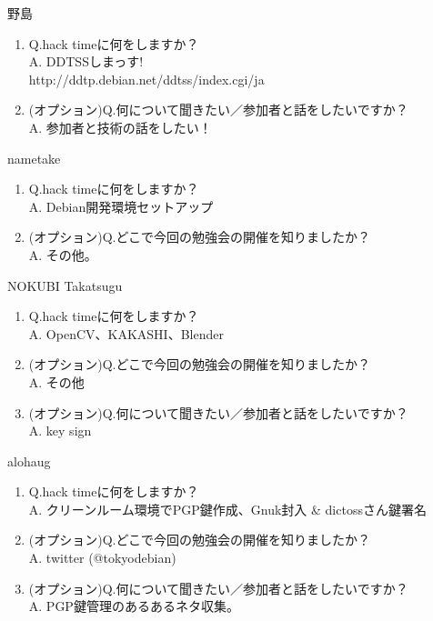 \begin{prework}{ 野島 }
  \begin{enumerate}
  \item Q.hack timeに何をしますか？\\
    A. DDTSSしまっす!\\
    http://ddtp.debian.net/ddtss/index.cgi/ja
  \item (オプション)Q.何について聞きたい／参加者と話をしたいですか？\\
    A. 参加者と技術の話をしたい！
  \end{enumerate}
\end{prework}

\begin{prework}{ nametake }
  \begin{enumerate}
  \item Q.hack timeに何をしますか？\\
    A. Debian開発環境セットアップ
  \item (オプション)Q.どこで今回の勉強会の開催を知りましたか？\\
    A. その他。
  \end{enumerate}
\end{prework}

\begin{prework}{ NOKUBI Takatsugu }
  \begin{enumerate}
  \item Q.hack timeに何をしますか？\\
    A. OpenCV、KAKASHI、Blender
  \item (オプション)Q.どこで今回の勉強会の開催を知りましたか？\\
    A. その他
  \item (オプション)Q.何について聞きたい／参加者と話をしたいですか？\\
    A. key sign
  \end{enumerate}
\end{prework}

\begin{prework}{ alohaug }
  \begin{enumerate}
  \item Q.hack timeに何をしますか？\\
    A. クリーンルーム環境でPGP鍵作成、Gnuk封入 \& dictossさん鍵署名
  \item (オプション)Q.どこで今回の勉強会の開催を知りましたか？\\
    A. twitter (@tokyodebian)
  \item (オプション)Q.何について聞きたい／参加者と話をしたいですか？\\
    A. PGP鍵管理のあるあるネタ収集。
  \end{enumerate}
\end{prework}

